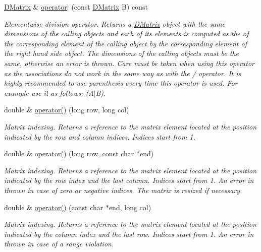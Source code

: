 \begin{DoxyCompactItemize}
\hyperlink{classDMatrix}{DMatrix} \& \hyperlink{classDMatrix_ada9cc203a754a96ac3cb6122c9eba0fd}{operator$|$} (const \hyperlink{classDMatrix}{DMatrix} B) const 
\begin{DoxyCompactList}\small\item\em Elementwise division operator. Returns a \hyperlink{classDMatrix}{DMatrix} object with the same dimensions of the calling objects and each of its elements is computed as the of the corresponding element of the calling object by the corresponding element of the right hand side object. The dimensions of the calling objects must be the same, otherwise an error is thrown. Care must be taken when using this operator as the associations do not work in the same way as with the / operator. It is highly recommended to use parenthesis every time this operator is used. For example use it as follows: (A$|$B). \item\end{DoxyCompactList}\item 
double \& \hyperlink{classDMatrix_ad944a2f5b2df21a1ae752f368e257f34}{operator()} (long row, long col)
\begin{DoxyCompactList}\small\item\em Matrix indexing. Returns a reference to the matrix element located at the position indicated by the row and column indices. Indices start from 1. \item\end{DoxyCompactList}\item 
double \& \hyperlink{classDMatrix_a15adc46b55cb516b67bb408447f8275e}{operator()} (long row, const char $\ast$end)
\begin{DoxyCompactList}\small\item\em Matrix indexing. Returns a reference to the matrix element located at the position indicated by the row index and the last column. Indices start from 1. An error in thrown in case of zero or negative indices. The matrix is resized if necessary. \item\end{DoxyCompactList}\item 
double \& \hyperlink{classDMatrix_a430e6b0a88061c4fe70e1c64ccaf285a}{operator()} (const char $\ast$end, long col)
\begin{DoxyCompactList}\small\item\em Matrix indexing. Returns a reference to the matrix element located at the position indicated by the column index and the last row. Indices start from 1. An error in thrown in case of a range violation. \item\end{DoxyCompactList}\item 

\end{DoxyCompactItemize}
